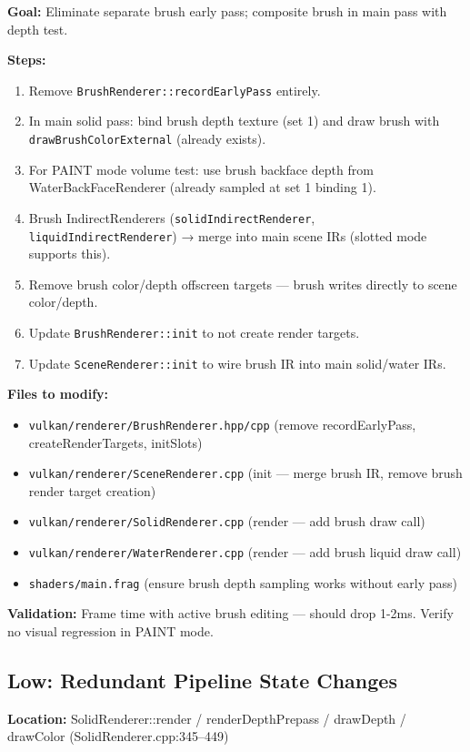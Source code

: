 \documentclass[11pt,a4paper]{article}
\begin{document}
\begin{tcolorbox}[promptbox={Prompt: Merge Brush Early Pass into Main Pass}]
\textbf{Goal:} Eliminate separate brush early pass; composite brush in main pass with depth test.

\textbf{Steps:}
\begin{enumerate}
    \item Remove \texttt{BrushRenderer::recordEarlyPass} entirely.
    \item In main solid pass: bind brush depth texture (set 1) and draw brush with \texttt{drawBrushColorExternal} (already exists).
    \item For PAINT mode volume test: use brush backface depth from WaterBackFaceRenderer (already sampled at set 1 binding 1).
    \item Brush IndirectRenderers (\texttt{solidIndirectRenderer}, \texttt{liquidIndirectRenderer}) → merge into main scene IRs (slotted mode supports this).
    \item Remove brush color/depth offscreen targets — brush writes directly to scene color/depth.
    \item Update \texttt{BrushRenderer::init} to not create render targets.
    \item Update \texttt{SceneRenderer::init} to wire brush IR into main solid/water IRs.
\end{enumerate}

\textbf{Files to modify:}
\begin{itemize}
    \item \texttt{vulkan/renderer/BrushRenderer.hpp/cpp} (remove recordEarlyPass, createRenderTargets, initSlots)
    \item \texttt{vulkan/renderer/SceneRenderer.cpp} (init — merge brush IR, remove brush render target creation)
    \item \texttt{vulkan/renderer/SolidRenderer.cpp} (render — add brush draw call)
    \item \texttt{vulkan/renderer/WaterRenderer.cpp} (render — add brush liquid draw call)
    \item \texttt{shaders/main.frag} (ensure brush depth sampling works without early pass)
\end{itemize}

\textbf{Validation:} Frame time with active brush editing — should drop 1-2ms. Verify no visual regression in PAINT mode.
\end{tcolorbox}

\subsection{Low: Redundant Pipeline State Changes}
\textbf{Location:} SolidRenderer::render / renderDepthPrepass / drawDepth / drawColor (SolidRenderer.cpp:345–449)
\end{document}
